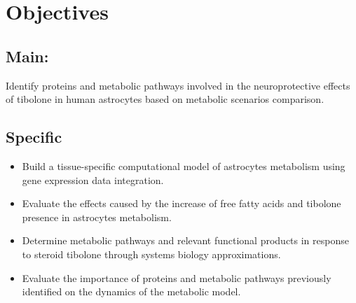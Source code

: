 \chapter*{Objectives}
\section*{Main:}
Identify proteins and metabolic pathways involved in the neuroprotective effects of tibolone in human astrocytes based on metabolic scenarios comparison.
\section*{Specific}
\begin{itemize}
\item Build a tissue-specific computational model of astrocytes metabolism using gene expression data integration.
\item Evaluate the effects caused by the increase of free fatty acids and tibolone presence in astrocytes metabolism.
\item Determine metabolic pathways and relevant functional products in response to steroid tibolone through systems biology approximations.
\item Evaluate the importance of proteins and metabolic pathways previously identified on the dynamics of the metabolic model.
\end{itemize}